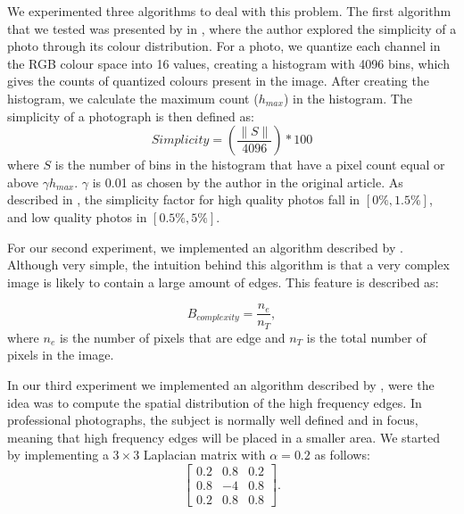 We experimented three algorithms to deal with this problem. The first algorithm that we tested was presented by \citeauthor{luo2008photo} in \cite{luo2008photo}, where the author explored the simplicity of a photo through its colour distribution. For a photo, we quantize each channel in the RGB colour space into 16 values, creating a histogram with 4096 bins, which gives the counts of quantized colours present in the image. After creating the histogram, we calculate the maximum count ($h_{max}$) in the histogram. The simplicity of a photograph is then defined as:
\begin{equation}
	Simplicity = \left(\frac{\|S\|}{4096}\right) * 100%
\end{equation}
where $S$ is the number of bins in the histogram that have a pixel count equal or above $\gamma h_{max}$. $\gamma$ is 0.01 as chosen by the author in the original article. As described in \cite{luo2008photo}, the simplicity factor for high quality photos fall in $[0\%,1.5\%]$, and low quality photos in $[0.5\%,5\%]$.


For our second experiment, we implemented an algorithm described by \citeauthor{kaoautomatic} \cite{kaoautomatic}. Although very simple, the intuition behind this algorithm is that a very complex image is likely to contain a large amount of edges. This feature is described as:

\begin{equation}
	B_{complexity} = \frac{n_{e}}{n_{T}},
\end{equation}
where $n_{e}$ is the number of pixels that are edge and $n_{T}$ is the total number of pixels in the image.
 

In our third experiment we implemented an algorithm described by \citeauthor{ke2006design} \cite{ke2006design}, were the idea was to compute the spatial distribution of the high frequency edges. In professional photographs, the subject is normally well defined and in focus, meaning that high frequency edges will be placed in a smaller area.
We started by implementing a $3\times3$ Laplacian matrix with $\alpha = 0.2$ as follows:
\begin{equation}
\begin{bmatrix}
  0.2 & 0.8 & 0.2 \\
  0.8 & -4 & 0.8 \\
  0.2 & 0.8 & 0.8
\end{bmatrix}.
\end{equation}


